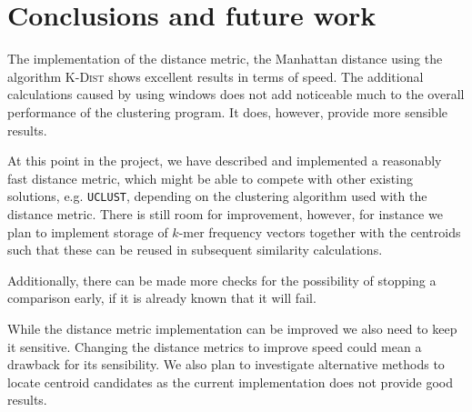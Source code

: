\section{Conclusions and future work}
\label{conclusions_and_future_work}

The implementation of the distance metric, the Manhattan distance using the
algorithm \textsc{K-Dist} shows excellent results in terms of speed. The
additional calculations caused by using windows does not add noticeable much
to the overall performance of the clustering program. It does, however,
provide more sensible results.

At this point in the project, we have described and implemented a reasonably
fast distance metric, which might be able to compete with other existing
solutions, e.g. \texttt{UCLUST}, depending on the clustering algorithm used
with the distance metric. There is still room for improvement, however, for
instance we plan to implement storage of $k$-mer frequency vectors together
with the centroids such that these can be reused in subsequent similarity
calculations.

Additionally, there can be made more checks for the possibility of stopping a
comparison early, if it is already known that it will fail.

While the distance metric implementation can be improved we also need to keep
it sensitive. Changing the distance metrics to improve speed could mean a
drawback for its sensibility. We also plan to investigate alternative methods
to locate centroid candidates as the current implementation does not provide
good results.


